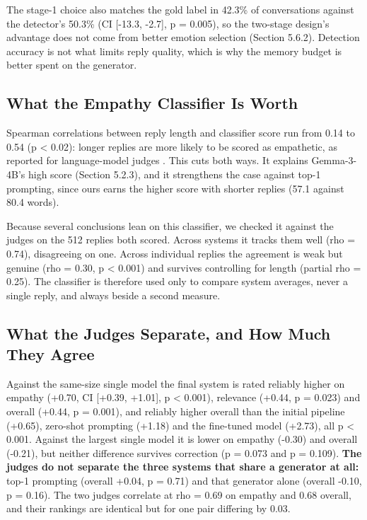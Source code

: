 The stage-1 choice also matches the gold label in 42.3\% of conversations against the detector's 50.3\% (CI [-13.3, -2.7], p = 0.005), so the two-stage design's advantage does not come from better emotion selection (Section 5.6.2). Detection accuracy is not what limits reply quality, which is why the memory budget is better spent on the generator.

\subsection{What the Empathy Classifier Is Worth}
\label{sec:5.4.4}

Spearman correlations between reply length and classifier score run from 0.14 to 0.54 (p < 0.02): longer replies are more likely to be scored as empathetic, as reported for language-model judges \cite{zheng2023judge}. This cuts both ways. It explains Gemma-3-4B's high score (Section 5.2.3), and it strengthens the case against top-1 prompting, since ours earns the higher score with shorter replies (57.1 against 80.4 words).

Because several conclusions lean on this classifier, we checked it against the judges on the 512 replies both scored. Across systems it tracks them well (rho = 0.74), disagreeing on one. Across individual replies the agreement is weak but genuine (rho = 0.30, p < 0.001) and survives controlling for length (partial rho = 0.25). The classifier is therefore used only to compare system averages, never a single reply, and always beside a second measure.

\subsection{What the Judges Separate, and How Much They Agree}
\label{sec:5.4.5}

Against the same-size single model the final system is rated reliably higher on empathy (+0.70, CI [+0.39, +1.01], p < 0.001), relevance (+0.44, p = 0.023) and overall (+0.44, p = 0.001), and reliably higher overall than the initial pipeline (+0.65), zero-shot prompting (+1.18) and the fine-tuned model (+2.73), all p < 0.001. Against the largest single model it is lower on empathy (-0.30) and overall (-0.21), but neither difference survives correction (p = 0.073 and p = 0.109). \textbf{The judges do not separate the three systems that share a generator at all: }top-1 prompting (overall +0.04, p = 0.71) and that generator alone (overall -0.10, p = 0.16). The two judges correlate at rho = 0.69 on empathy and 0.68 overall, and their rankings are identical but for one pair differing by 0.03.


